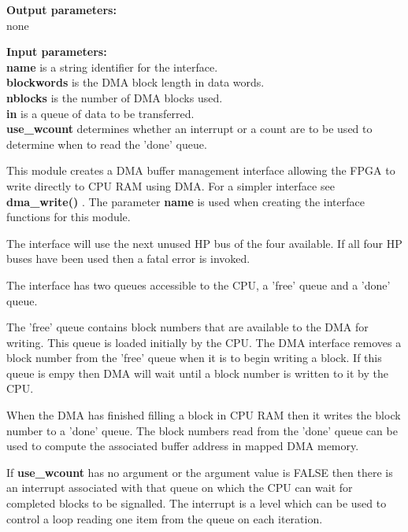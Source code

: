             {\bf Output parameters:} \\
            none

            {\bf Input parameters:} \\            
            {\bf name} is a string identifier for the interface.\\
            {\bf blockwords} is the DMA block length in data words.\\
            {\bf nblocks} is the number of DMA blocks used.\\
            {\bf in} is a queue of data to be transferred.\\
            {\bf use\_wcount} determines whether an interrupt or a count are
            to be used to determine when to read the 'done' queue.
            
            This module creates a DMA buffer management interface allowing the FPGA
            to write directly to CPU RAM using DMA. For a simpler interface see {\bf
            dma\_write()} . The parameter {\bf name} is
            used when creating the interface functions for this module.
            
            The interface will use the next unused HP bus of the four available.
            If all four HP buses have been used then a fatal error is invoked.
            
            The interface has two queues accessible to the CPU, a 'free' queue and
            a 'done' queue.
            
            The 'free' queue contains block numbers that are available to the DMA
            for writing. This queue is loaded initially by the CPU. The DMA
            interface removes a block number from the 'free' queue when it is to
            begin writing a block. If this queue is empy then DMA will wait until
            a block number is written to it by the CPU.

            When the DMA has finished filling a block in CPU RAM then it writes
            the block number to a 'done' queue. The block numbers read from the
            'done' queue can be used to compute the associated buffer address in
            mapped DMA memory.
            
            If {\bf use\_wcount} has no argument or the argument value is FALSE
            then there is an interrupt associated with that queue on which the
            CPU can wait for completed blocks to be signalled. The interrupt is
            a level which can be used to control a loop reading one item from
            the queue on each iteration.
            
